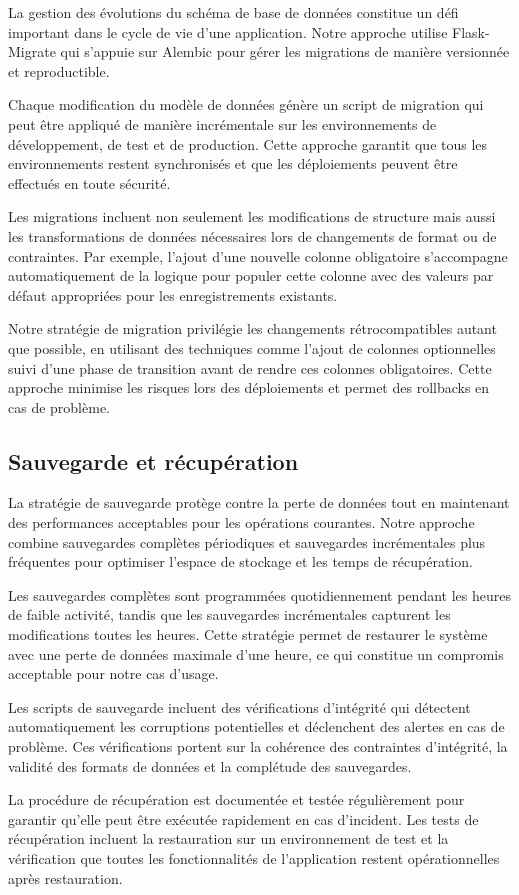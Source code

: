 La gestion des évolutions du schéma de base de données constitue un défi important dans le cycle de vie d'une application. Notre approche utilise Flask-Migrate qui s'appuie sur Alembic pour gérer les migrations de manière versionnée et reproductible.

Chaque modification du modèle de données génère un script de migration qui peut être appliqué de manière incrémentale sur les environnements de développement, de test et de production. Cette approche garantit que tous les environnements restent synchronisés et que les déploiements peuvent être effectués en toute sécurité.

Les migrations incluent non seulement les modifications de structure mais aussi les transformations de données nécessaires lors de changements de format ou de contraintes. Par exemple, l'ajout d'une nouvelle colonne obligatoire s'accompagne automatiquement de la logique pour populer cette colonne avec des valeurs par défaut appropriées pour les enregistrements existants.

Notre stratégie de migration privilégie les changements rétrocompatibles autant que possible, en utilisant des techniques comme l'ajout de colonnes optionnelles suivi d'une phase de transition avant de rendre ces colonnes obligatoires. Cette approche minimise les risques lors des déploiements et permet des rollbacks en cas de problème.

\subsection{Sauvegarde et récupération}

La stratégie de sauvegarde protège contre la perte de données tout en maintenant des performances acceptables pour les opérations courantes. Notre approche combine sauvegardes complètes périodiques et sauvegardes incrémentales plus fréquentes pour optimiser l'espace de stockage et les temps de récupération.

Les sauvegardes complètes sont programmées quotidiennement pendant les heures de faible activité, tandis que les sauvegardes incrémentales capturent les modifications toutes les heures. Cette stratégie permet de restaurer le système avec une perte de données maximale d'une heure, ce qui constitue un compromis acceptable pour notre cas d'usage.

Les scripts de sauvegarde incluent des vérifications d'intégrité qui détectent automatiquement les corruptions potentielles et déclenchent des alertes en cas de problème. Ces vérifications portent sur la cohérence des contraintes d'intégrité, la validité des formats de données et la complétude des sauvegardes.

La procédure de récupération est documentée et testée régulièrement pour garantir qu'elle peut être exécutée rapidement en cas d'incident. Les tests de récupération incluent la restauration sur un environnement de test et la vérification que toutes les fonctionnalités de l'application restent opérationnelles après restauration.